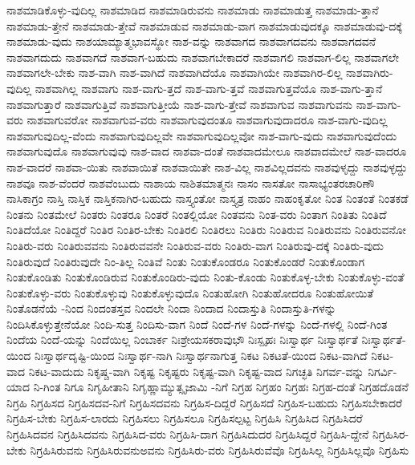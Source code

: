 {ನಾಶಮಾಡಿಕೊಳ್ಳು-ವುದಿಲ್ಲ
ನಾಶಮಾಡಿದ
ನಾಶಮಾಡಿರುವನು
ನಾಶಮಾಡು
ನಾಶಮಾಡುತ್ತ
ನಾಶಮಾಡು-ತ್ತಾನೆ
ನಾಶಮಾಡು-ತ್ತೇನೆ
ನಾಶಮಾಡು-ತ್ತೇವೆ
ನಾಶಮಾಡುವ
ನಾಶಮಾಡು-ವಾಗ
ನಾಶಮಾಡುವುದಕ್ಕೂ
ನಾಶಮಾಡುವು-ದಕ್ಕೆ
ನಾಶಮಾಡು-ವುದು
ನಾಶಯಾಮ್ಯಾತ್ಮಭಾವಸ್ಥೋ
ನಾಶ-ವನ್ನು
ನಾಶವಾಗದ
ನಾಶವಾಗದವನು
ನಾಶವಾಗದವನೆ
ನಾಶವಾಗದುದು
ನಾಶವಾಗದೆ
ನಾಶವಾಗ-ಬಹುದು
ನಾಶವಾಗಬೇಕಾದರೆ
ನಾಶವಾಗಲಿ
ನಾಶವಾಗ-ಲಿಲ್ಲ
ನಾಶವಾಗಲೇ
ನಾಶವಾಗಲೇ-ಬೇಕು
ನಾಶ-ವಾಗಿ
ನಾಶ-ವಾಗಿದೆ
ನಾಶವಾಗಿದೆಯೊ
ನಾಶವಾಗಿಯೇ
ನಾಶವಾಗಿರ-ಲಿಲ್ಲ
ನಾಶವಾಗಿರು-ವುದಿಲ್ಲ
ನಾಶವಾಗಿಲ್ಲ
ನಾಶವಾಗು
ನಾಶ-ವಾಗು-ತ್ತದೆ
ನಾಶ-ವಾಗು-ತ್ತವೆ
ನಾಶವಾಗುತ್ತವೆಯೊ
ನಾಶ-ವಾಗು-ತ್ತಾನೆ
ನಾಶವಾಗುತ್ತಾರೆ
ನಾಶವಾಗುತ್ತಿವೆ
ನಾಶವಾಗುತ್ತೀಯೆ
ನಾಶ-ವಾಗು-ತ್ತೇವೆ
ನಾಶವಾಗುವ
ನಾಶವಾಗುವನು
ನಾಶ-ವಾಗು-ವರು
ನಾಶವಾಗುವರೋ
ನಾಶವಾಗುವ-ವರು
ನಾಶವಾಗುವುದಂತೂ
ನಾಶವಾಗುವುದಾದರೂ
ನಾಶ-ವಾಗು-ವುದಿಲ್ಲ
ನಾಶವಾಗುವುದಿಲ್ಲ-ವೆಂದು
ನಾಶವಾಗುವುದಿಲ್ಲವೇ
ನಾಶವಾಗುವುದಿಲ್ಲವೋ
ನಾಶ-ವಾಗು-ವುದು
ನಾಶವಾಗುವುದೆಂದು
ನಾಶವಾಗುವುದೊ
ನಾಶವಾಗುವುವು
ನಾಶ-ವಾದ
ನಾಶವಾ-ದಂತೆ
ನಾಶವಾದಮೇಲೂ
ನಾಶವಾದಮೇಲೆ
ನಾಶ-ವಾದರೂ
ನಾಶ-ವಾದರೆ
ನಾಶವಾ-ಯಿತು
ನಾಶವಾಯಿತೆ
ನಾಶವಾಯಿತೇ
ನಾಶ-ವಿಲ್ಲ
ನಾಶವಿಲ್ಲದವನು
ನಾಶವುಳೃದ್ದು
ನಾಶವುಳ್ಳದ್ದು
ನಾಶವೂ
ನಾಶ-ವೆಂದರೆ
ನಾಶವೆಂಬುದು
ನಾಶಾಯ
ನಾಶಿತಮಾತ್ಮನಃ
ನಾಸಂ
ನಾಸತೋ
ನಾಸಾಭ್ಯಂತರಚಾರಿಣೌ
ನಾಸಿಕಾಗ್ರಂ
ನಾಸ್ತಿ
ನಾಸ್ತಿಕ
ನಾಸ್ತಿಕನಾಗಿರ-ಬಹುದು
ನಾಸ್ತ್ಯಂತೋ
ನಾಸ್ತ್ಯತ್ರ
ನಾಹಂ
ನಾಹಂಕೃತೋ
ನಿಂತ
ನಿಂತಂತೆ
ನಿಂತಕಡೆ
ನಿಂತನು
ನಿಂತಮೇಲೆ
ನಿಂತರು
ನಿಂತರೂ
ನಿಂತರೆ
ನಿಂತಲ್ಲಿಯೋ
ನಿಂತವನು
ನಿಂತ-ವರು
ನಿಂತಾಗ
ನಿಂತಿತು
ನಿಂತಿದೆ
ನಿಂತಿದೆಯೋ
ನಿಂತಿದ್ದರೆ
ನಿಂತಿರ
ನಿಂತಿರ-ಬೇಕು
ನಿಂತಿರಲಿ
ನಿಂತಿರಲು
ನಿಂತಿರು
ನಿಂತಿರುವ
ನಿಂತಿರುವನು
ನಿಂತಿರುವನೋ
ನಿಂತಿರು-ವರು
ನಿಂತಿರುವವನು
ನಿಂತಿರುವವನೇ
ನಿಂತಿರುವ-ವರು
ನಿಂತಿರು-ವಾಗ
ನಿಂತಿರುವು-ದಕ್ಕೆ
ನಿಂತಿರು-ವುದು
ನಿಂತಿರುವುದೆ
ನಿಂತಿರುವುದೇ
ನಿಂ-ತಿಲ್ಲ
ನಿಂತಿವೆ
ನಿಂತು
ನಿಂತುಕೊಂಡರೂ
ನಿಂತುಕೊಂಡರೆ
ನಿಂತುಕೊಂಡಾಗ
ನಿಂತುಕೊಂಡಿತು
ನಿಂತುಕೊಂಡಿರುವ
ನಿಂತುಕೊಂಡಿರು-ವುದು
ನಿಂತು-ಕೊಂಡು
ನಿಂತುಕೊಳ್ಳ-ಬೇಕು
ನಿಂತುಕೊಳ್ಳು-ವಂತೆ
ನಿಂತುಕೊಳ್ಳು-ವರು
ನಿಂತುಕೊಳ್ಳುವು
ನಿಂತುಕೊಳ್ಳುವುದೊ
ನಿಂತುಹೋಗಿ
ನಿಂತುಹೋದರೂ
ನಿಂತುಹೋಯಿತೆ
ನಿಂತೊಡನೆಯೆ
-ನಿಂದ
ನಿಂದಂತಸ್ತವ
ನಿಂದಲೇ
ನಿಂದಾ
ನಿಂದಾದ
ನಿಂದಾಸ್ತುತಿ
ನಿಂದಾಸ್ತುತಿ-ಗಳನ್ನು
ನಿಂದಿಸಿಕೊಳ್ಳುತ್ತೇನೆಯೋ
ನಿಂದಿ-ಸುತ್ತ
ನಿಂದಿಸು-ವಾಗ
ನಿಂದೆ
ನಿಂದೆ-ಗಳ
ನಿಂದೆ-ಗಳನ್ನು
ನಿಂದೆ-ಗಳಲ್ಲಿ
ನಿಂದೆ-ಗಿಂತ
ನಿಂದೆಯ
ನಿಂದೆ-ಯನ್ನು
ನಿಂದೆಯಿಲ್ಲ
ನಿಂಬಾರ್ಕ
ನಿಃಶ್ರೇಯಸಕರಾವುಭೌ
ನಿಃಸ್ಪೃಹಃ
ನಿಃಸ್ವಾರ್ಥ
ನಿಃಸ್ವಾರ್ಥತೆ
ನಿಃಸ್ವಾರ್ಥತೆ-ಯಿಂದ
ನಿಃಸ್ವಾರ್ಥದೃಷ್ಟಿ-ಯಿಂದ
ನಿಃಸ್ವಾರ್ಥ-ನಾಗಿ
ನಿಃಸ್ವಾರ್ಥನಾಗುತ್ತ
ನಿಕಟ
ನಿಕಟತೆ-ಯಿಂದ
ನಿಕಟ-ವಾಗಿದೆ
ನಿಕಟ-ವಾದ
ನಿಕಟ-ವಾದುದು
ನಿಕೃಷ್ಚ-ವಾಗಿ
ನಿಕೃಷ್ಟ
ನಿಕೃಷ್ಟರು
ನಿಕೃಷ್ಟ-ವಾಗಿ
ನಿಕೃಷ್ಟ-ವಾದ
ನಿಗಚ್ಛತಿ
ನಿಗರ್ವ-ವನ್ನು
ನಿಗರ್ವಿ-ಯಾದ
ನಿ-ಗಿಂತ
ನಿಗೂ
ನಿಗೃಹೀತಾನಿ
ನಿಗೃಹ್ಣಾಮ್ಯುತ್ಸೃಜಾಮಿ
-ನಿಗೆ
ನಿಗ್ರಹ
ನಿಗ್ರಹಂ
ನಿಗ್ರಹಃ
ನಿಗ್ರಹ-ದಂತೆ
ನಿಗ್ರಹದೊಡನೆ
ನಿಗ್ರಹಿ
ನಿಗ್ರಹಿಸದ
ನಿಗ್ರಹಿಸದವ-ನಿಗೆ
ನಿಗ್ರಹಿಸದವನು
ನಿಗ್ರಹಿಸ-ದಿದ್ದರೆ
ನಿಗ್ರಹಿಸದೆ
ನಿಗ್ರಹಿಸ-ಬಹುದು
ನಿಗ್ರಹಿಸಬೇಕಾದರೆ
ನಿಗ್ರಹಿಸ-ಬೇಕು
ನಿಗ್ರಹಿಸ-ಲಾರದು
ನಿಗ್ರಹಿಸಲು
ನಿಗ್ರಹಿಸಲೂ
ನಿಗ್ರಹಿಸಲ್ಪಟ್ಟ
ನಿಗ್ರಹಿಸಿ
ನಿಗ್ರಹಿಸಿದ
ನಿಗ್ರಹಿಸಿದರೆ
ನಿಗ್ರಹಿಸಿದವನ
ನಿಗ್ರಹಿಸಿದವನು
ನಿಗ್ರಹಿಸಿದ-ವರು
ನಿಗ್ರಹಿಸಿ-ದಾಗ
ನಿಗ್ರಹಿಸಿದುದರ
ನಿಗ್ರಹಿಸಿದ್ದರೆ
ನಿಗ್ರಹಿಸಿ-ದ್ದೇನೆ
ನಿಗ್ರಹಿಸಿರ-ಬೇಕು
ನಿಗ್ರಹಿಸಿರುವನು
ನಿಗ್ರಹಿಸಿರುವನುಅವನು
ನಿಗ್ರಹಿಸಿರು-ವರು
ನಿಗ್ರಹಿಸಿರುವೆವೊ
ನಿಗ್ರಹಿಸಿಲ್ಲ
ನಿಗ್ರಹಿಸಿಲ್ಲವೊ
ನಿಗ್ರಹಿಸು
}
